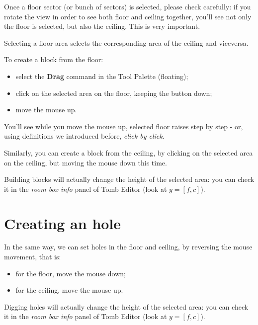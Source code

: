 Once a floor sector (or bunch of sectors) is selected, please check carefully: if you rotate the view in order to see both floor and ceiling together, you'll see not only the floor is selected, but also the ceiling. This is very important.

\begin{remark}
    Selecting a floor area selects the corresponding area of the ceiling and viceversa.
\end{remark}

To create a block from the floor:
\begin{itemize}
    \item select the \textbf{Drag} command in the Tool Palette (floating);
    \item {} click on the selected area on the floor, keeping the button down;
    \item move the mouse up.
\end{itemize}

You'll see while you move the mouse up, selected floor raises step by step - or, using definitions we introduced before, \emph{click by click}.

\par Similarly, you can create a block from the ceiling, by clicking on the selected area on the ceiling, but moving the mouse down this time.

\par Building blocks will actually change the height of the selected area: you can check it in the \emph{room box info} panel of Tomb Editor (look at \( y = [f, c] \)).

\section{Creating an hole}

In the same way, we can set holes in the floor and ceiling, by reversing the mouse movement, that is:
\begin{itemize}
    \item for the floor, move the mouse down;
    \item for the ceiling, move the mouse up.
\end{itemize}

\par Digging holes will actually change the height of the selected area: you can check it in the \emph{room box info} panel of Tomb Editor (look at \( y = [f, c] \)).

